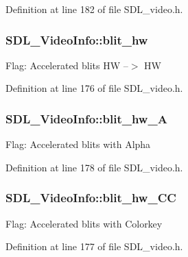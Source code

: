 Definition at line 182 of file S\+D\+L\+\_\+video.\+h.

\hypertarget{struct_s_d_l___video_info_afd985d7ee038d978694ebe0203338837}{}
\subsubsection[{blit\+\_\+hw}]{ S\+D\+L\+\_\+\+Video\+Info\+::blit\+\_\+hw}\label{struct_s_d_l___video_info_afd985d7ee038d978694ebe0203338837}
Flag\+: Accelerated blits H\+W --$>$ H\+W 

Definition at line 176 of file S\+D\+L\+\_\+video.\+h.

\hypertarget{struct_s_d_l___video_info_a2153563e63065ba5a66836ad03f0cd68}{}
\subsubsection[{blit\+\_\+hw\+\_\+\+A}]{ S\+D\+L\+\_\+\+Video\+Info\+::blit\+\_\+hw\+\_\+\+A}\label{struct_s_d_l___video_info_a2153563e63065ba5a66836ad03f0cd68}
Flag\+: Accelerated blits with Alpha 

Definition at line 178 of file S\+D\+L\+\_\+video.\+h.

\hypertarget{struct_s_d_l___video_info_af62ba97a72e925000dde2ea27c854b7f}{}
\subsubsection[{blit\+\_\+hw\+\_\+\+C\+C}]{ S\+D\+L\+\_\+\+Video\+Info\+::blit\+\_\+hw\+\_\+\+C\+C}\label{struct_s_d_l___video_info_af62ba97a72e925000dde2ea27c854b7f}
Flag\+: Accelerated blits with Colorkey 

Definition at line 177 of file S\+D\+L\+\_\+video.\+h.

\hypertarget{struct_s_d_l___video_info_aa7dc499b5b1bea4bdb4de04bd58fc796}{}
